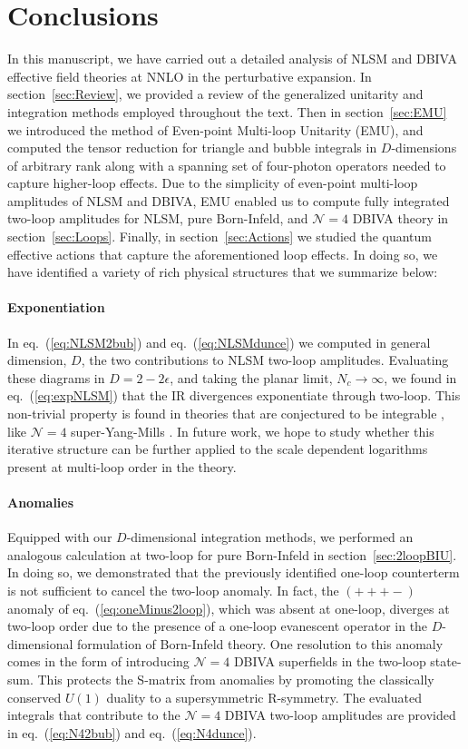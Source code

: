 \documentclass[12pt,letter]{article}
\def\sect#1{section~\ref{#1}}
\def\eqn#1{eq.~(\ref{#1})}
\begin{document}
\section{Conclusions}\label{sec:Discussion}
In this manuscript, we have carried out a detailed analysis of NLSM and DBIVA effective field theories at NNLO in the perturbative expansion. In \sect{sec:Review}, we provided a review of the generalized unitarity and integration methods employed throughout the text. Then in \sect{sec:EMU} we introduced the method of Even-point Multi-loop Unitarity (EMU), and computed the tensor reduction for triangle and bubble integrals in $D$-dimensions of arbitrary rank along with a spanning set of four-photon operators needed to capture higher-loop effects. Due to the simplicity of even-point multi-loop amplitudes of NLSM and DBIVA, EMU enabled us to compute fully integrated two-loop amplitudes for NLSM, pure Born-Infeld, and $\mathcal{N}=4$ DBIVA theory in \sect{sec:Loops}. Finally, in \sect{sec:Actions} we studied the quantum effective actions that capture the aforementioned loop effects. In doing so, we have identified a variety of rich physical structures that we summarize below: 
\paragraph{\textbf{Exponentiation}} In \eqn{eq:NLSM2bub} and \eqn{eq:NLSMdunce} we computed in general dimension, $D$, the two contributions to NLSM two-loop amplitudes. Evaluating these diagrams in $D=2-2\epsilon$, and taking the planar limit, $N_c \rightarrow \infty$, we found in \eqn{eq:expNLSM} that the IR divergences exponentiate through two-loop. This non-trivial property is found in theories that are conjectured to be integrable \cite{Shankar:1977cm,Zamolodchikov:1977nu,Zamolodchikov:1978xm, Komatsu:2019hgc}, like $\mathcal{N}=4$ super-Yang-Mills \cite{Anastasiou:2003kj,Bern:2005iz}. In future work, we hope to study whether this iterative structure can be further applied to the scale dependent logarithms present at multi-loop order in the theory. 
\paragraph{\textbf{Anomalies}} Equipped with our $D$-dimensional integration methods, we performed an analogous calculation at two-loop for pure Born-Infeld in \sect{sec:2loopBIU}. In doing so, we demonstrated that the previously identified one-loop counterterm is not sufficient to cancel the two-loop anomaly. In fact, the $(+++-)$ anomaly of \eqn{eq:oneMinus2loop}, which was absent at one-loop, diverges at two-loop order due to the presence of a one-loop evanescent operator in the $D$-dimensional formulation of Born-Infeld theory. One resolution to this anomaly comes in the form of introducing $\mathcal{N}=4$ DBIVA superfields in the two-loop state-sum. This protects the S-matrix from anomalies by promoting the classically conserved $U(1)$ duality to a supersymmetric R-symmetry. The evaluated integrals that contribute to the $\mathcal{N}=4$ DBIVA two-loop amplitudes are provided in \eqn{eq:N42bub} and \eqn{eq:N4dunce}. 
\end{document}
